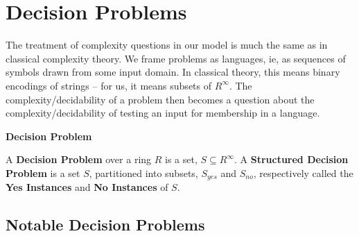  
  \section{Decision Problems}

  The treatment of complexity questions in our model is much the same
  as in classical complexity theory.  We frame problems as languages,
  ie, as sequences of symbols drawn from some input domain.  In
  classical theory, this means binary encodings of strings -- for us,
  it means subsets of $R^\infty$.  The complexity/decidability of a
  problem then becomes a question about the complexity/decidability of
  testing an input for membership in a language.

  \begin{definition}{\textbf{Decision Problem}}
      
    A \textbf{Decision Problem} over a ring $R$ is a set, $S \subseteq
    R^\infty$.  A \textbf{Structured Decision Problem} is a set $S$,
    partitioned into subsets, $S_{yes}$ and $S_{no}$, respectively
    called the \textbf{Yes Instances} and \textbf{No Instances} of
    $S$.
 
  \end{definition}

  \subsection{Notable Decision Problems}


